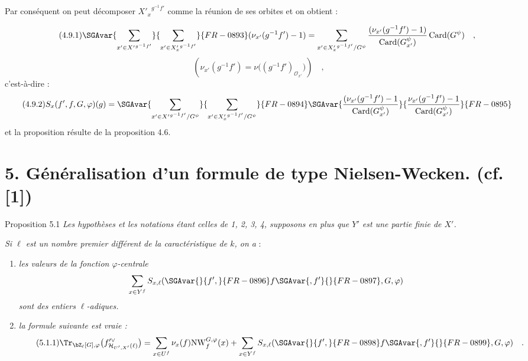 Par conséquent on peut décomposer ${X'_x}^{g^{-1}f'}$ comme la réunion de ses orbites et on obtient :

\begin{equation}\tag{4.9.1}
\SGAvar{\sum_{x' \in {X'}^{g^{-1}f'}}}{\sum_{x' \in {X'_x}^{g^{-1}f'}}}{FR-0893} (\nu_{x'}(g^{-1}f') - 1) = \sum_{x' \in {X'_x}^{g^{-1}f'}/G^\psi} \frac{(\nu_{x'}(g^{-1}f') - 1)}{\operatorname{Card}(G^\psi_{x'})} \operatorname{Card}(G^\psi) \quad ,
\end{equation}
\[
(\nu_{x'}(g^{-1}f')=\nu\bigl((g^{-1}f')_{\mathcal{O}_{x'}}\bigr)) \quad ,
\]
c'est-à-dire :
\begin{equation}\tag{4.9.2}
S_x(f',f,G,\varphi)(g)=\SGAvar{\sum_{x' \in {X'}^{g^{-1}f'}/G^\psi}}{\sum_{x' \in {X'_x}^{g^{-1}f'}/G^\psi}}{FR-0894}
\SGAvar{\frac{(\nu_{x'}(g^{-1}f')-1}{\operatorname{Card}(G^\psi_{x'})}}{\frac{\nu_{x'}(g^{-1}f')-1}{\operatorname{Card}(G^\psi_{x'})}}{FR-0895}
\end{equation}
et la proposition résulte de la proposition 4.6.


\section*{5. Généralisation d'un formule de type Nielsen-Wecken. {\normalfont (cf.[1])}}

\begin{statement}{Proposition 5.1}
\emph{Les hypothèses et les notations étant celles de 1, 2, 3, 4, supposons en plus que $Y'$ est une partie finie de $X'$.}

\emph{Si $\ell$ est un nombre premier différent de la caractéristique de $k$, on a} :
\begin{enumerate}[label=\alph*)]
\item \emph{les valeurs de la fonction $\varphi$-centrale}
\[
\sum_{x\in Y^f} S_{x,\ell}(\SGAvar{}{f',}{FR-0896}f\SGAvar{,f'}{}{FR-0897},G,\varphi)
\]
\emph{sont des entiers $\ell$-adiques.}
\item \emph{la formule suivante est vraie :}
\begin{equation}\tag{5.1.1}
\Tr_{\bZ_\ell[G],\varphi}\bigl(f'^\vee_{\mathcal{H}_{U',X'}(\ell)}\bigr)
= \sum_{x\in U^f}\nu_x(f)\mathrm{NW}^{G,\varphi}_f(x)+\sum_{x\in Y^f}S_{x,\ell}(\SGAvar{}{f',}{FR-0898}f\SGAvar{,f'}{}{FR-0899},G,\varphi) \quad .
\end{equation}
\end{enumerate}
\end{statement}

